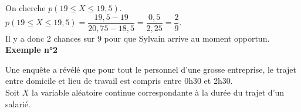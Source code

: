 On cherche $p\left(19 \leqslant X \leqslant 19,5\right)$. \\

$p\left(19 \leqslant X \leqslant 19,5\right) = \dfrac{19,5-19}{20,75-18,5} = \dfrac{0,5}{2,25} = \dfrac{2}{9}$. \\

Il y a donc 2 chances sur 9 pour que Sylvain arrive au moment opportun. \\

\textbf{Exemple n°2} 

Une enquête a révélé que pour tout le personnel d'une grosse entreprise, le trajet entre domicile et lieu de travail est compris entre 0h30 et 2h30. \\

Soit $X$ la variable aléatoire continue correspondante à la durée du trajet d'un salarié. \\

